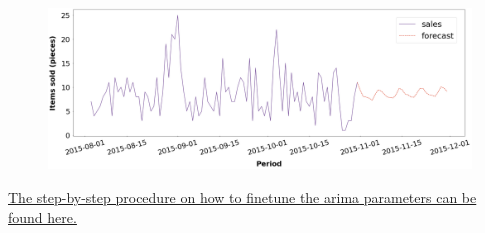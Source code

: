 \begin{figure}[h]
  \centering
  \includegraphics[width=0.88\linewidth]{external_content/graphs/final_arima_forecast.png}
  \captionsetup{justification=centering}
  \label{fig:arima_forecast}
\end{figure}

\vspace*{-8mm}
\begin{center}
\href{\finalARIMAurl}{The step-by-step procedure on how to finetune the \acrshort{arima} parameters can be found here.}
\end{center}
